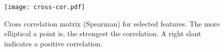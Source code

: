 \documentclass{sig-alternate}
\begin{document}

\begin{figure}
  \begin{center}
    \texttt{[image: cross-cor.pdf]}
  \end{center}
  \caption{Cross correlation matrix (Spearman) for selected features. The more elliptical a point is, the strongest the correlation. A right slant indicates
  a positive correlation.}
  \label{fig:crosscor}
\end{figure}
\end{document}
